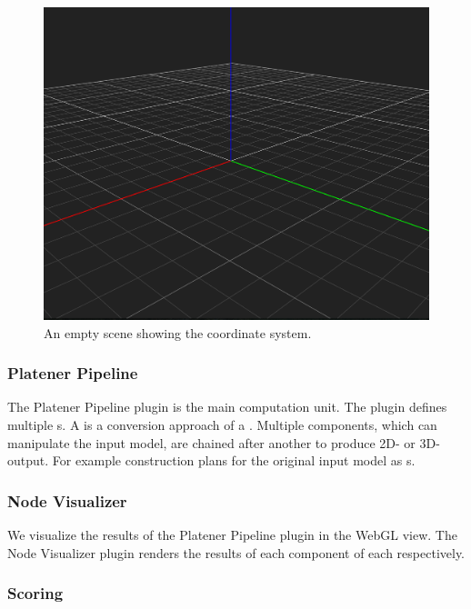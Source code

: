 \documentclass[../ClassicThesis.tex]{subfiles}
\begin{document}
\begin{figure}
\label{fig:architecture_overview_coordinate_system}
\includegraphics[width=1\columnwidth]{Images/03-architecture_overview_coordinate_system.png}
\caption{An empty scene showing the coordinate system.}
\end{figure}

\subsubsection{Platener Pipeline}

The Platener Pipeline plugin is the main computation unit. The plugin defines
multiple {\fabmethod}s. A {\fabmethod} is a conversion approach of a
\threedmodel. Multiple components, which can manipulate the input model, are
chained after another to produce 2D- or 3D-output. For example construction
plans for the original input model as {\svgfile}s.

\subsubsection{Node Visualizer}

We visualize the results of the Platener Pipeline plugin in the WebGL view. The
Node Visualizer plugin renders the results of each component of each
{\fabmethod} respectively.

\subsubsection{Scoring}
\end{document}
